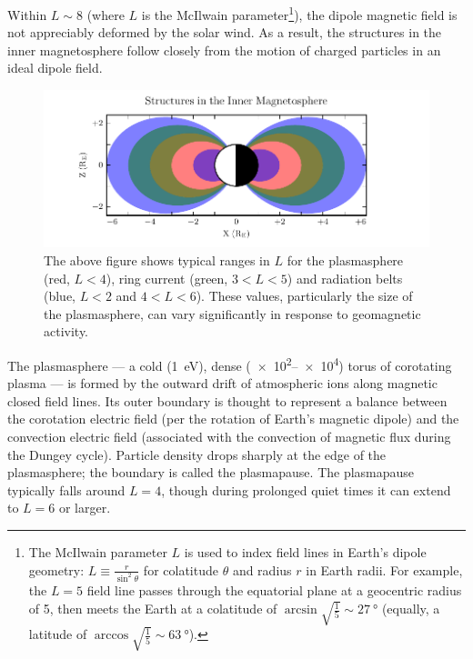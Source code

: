 Within $L \sim 8$ (where $L$ is the McIlwain parameter\footnote{The McIlwain
parameter $L$ is used to index field lines in Earth's dipole geometry:
$L \equiv \frac{r}{\sin^2\theta}$ for colatitude $\theta$ and radius $r$ in
Earth radii. For example, the $L=5$ field line passes through the equatorial
plane at a geocentric radius of \SI{5}{\RE}, then meets the Earth at a
colatitude of $\arcsin \sqrt{ \frac{1}{5} } \sim \SI{27}{\degree}$ (equally, a
latitude of $\arccos \sqrt{ \frac{1}{5} } \sim \SI{63}{\degree}$). }), the
dipole magnetic field is not appreciably deformed by the solar wind. As a
result, the structures in the inner magnetosphere follow closely from the
motion of charged particles in an ideal dipole field. 

\begin{figure}[!htb]
  \centering
  \includegraphics[width=\textwidth]{figures/inner_magnetosphere.pdf}
  \caption[Structures in the Inner Magnetosphere]{
    The above figure shows typical ranges in $L$ for the plasmasphere (red,
    $L < 4$), ring current (green, $3 < L < 5$) and radiation belts (blue,
    $L < 2$ and $4 < L < 6$). These values, particularly the size of the
    plasmasphere, can vary significantly in response to geomagnetic activity. 
  }
  \label{fig_inner_magnetosphere}
\end{figure}

The plasmasphere --- a cold (\about\SI{1}{\eV}), dense
(\SIrange{e2}{e4}{\percc}) torus of corotating plasma --- is formed by the
outward drift of atmospheric ions along magnetic closed field lines. Its outer
boundary is thought to represent a balance between the corotation electric
field (per the rotation of Earth's magnetic dipole) and the convection electric
field (associated with the convection of magnetic flux during the Dungey
cycle). Particle density drops sharply at the edge of the plasmasphere; the
boundary is called the plasmapause. The plasmapause typically falls around
$L=4$, though during prolonged quiet times it can extend to $L=6$ or larger. 

